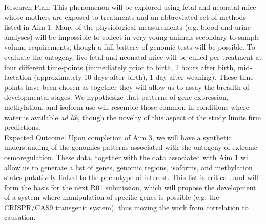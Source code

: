 Research Plan: This phenomenon will be explored using fetal and neonatal mice whose mothers are exposed to treatments and an abbreviated set of methods listed in Aim 1. Many of the physiological measurements  (e.g. blood and urine analyses) will be impossible to collect in very young animals secondary to sample volume requirements, though a full battery of genomic tests will be possible. To evaluate the ontogeny, five fetal and neonatal mice will be culled per treatment at four different time-points (immediately prior to birth, 2 hours after birth, mid-lactation (approximately 10 days after birth), 1 day after weaning). These time-points have been chosen as together they will allow us to assay the breadth of developmental stages.  We hypothesize that patterns of gene expression, methylation, and isoform use will resemble those common in conditions where water is available \textit{ad lib}, though the novelty of this aspect of the study limits firm predictions. \\

Expected Outcome: Upon completion of Aim 3, we will have a synthetic understanding of the genomics patterns associated with the ontogeny of extreme osmoregulation. These data, together with the data associated with Aim 1 will allow us to generate a list of genes, genomic regions, isoforms, and methylation states putatively linked to the phenotype of interest. This list is critical, and will form the basis for the next R01 submission, which will propose the development of a system where manipulation of specific genes is possible (e.g. the CRISPR/CAS9 transgenic system), thus moving the work from correlation to causation. 

